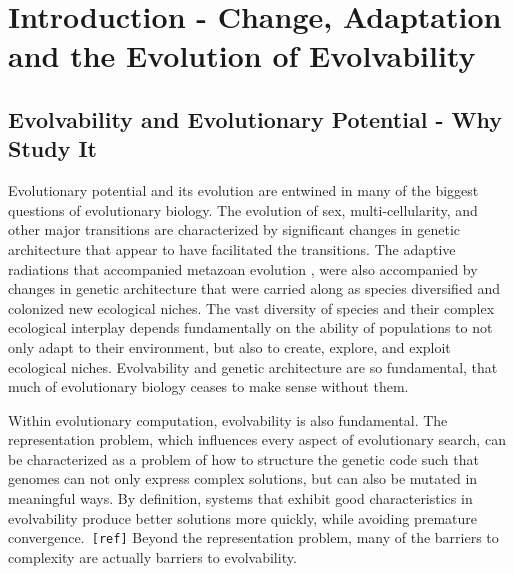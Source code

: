 \section{Introduction - Change, Adaptation and the Evolution of Evolvability}
\subsection{Evolvability and Evolutionary Potential - Why Study It} 
Evolutionary potential and its evolution are entwined in many of the biggest questions of evolutionary biology. The evolution of sex, multi-cellularity, and other major transitions are characterized by significant changes in genetic architecture that appear to have facilitated the transitions. \cite{szathmary_major_1995} The adaptive radiations that accompanied metazoan evolution \cite{kirschner_evolvability_1998}, were also accompanied by changes in genetic architecture that were carried along as species diversified and colonized new ecological niches. The vast diversity of species and their complex ecological interplay depends fundamentally on the ability of populations to not only adapt to their environment, but also to create, explore, and exploit ecological niches. Evolvability and genetic architecture are so fundamental, that much of evolutionary biology ceases to make sense without them. 

Within evolutionary computation, evolvability is also fundamental. The representation problem, which influences every aspect of evolutionary search, can be characterized as a problem of how to structure the genetic code such that genomes can not only express complex solutions, but can also be mutated in meaningful ways. \cite{dawkins_13_2003} By definition, systems that exhibit good characteristics in evolvability produce better solutions more quickly, while avoiding premature convergence.\verb| [ref]| Beyond the representation problem, many of the barriers to complexity are actually barriers to evolvability.

